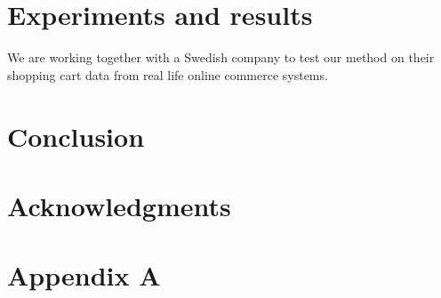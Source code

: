 \documentclass{acm_proc_article-sp}
\begin{document}

\section{Experiments and results}

We are working together with a Swedish company to test our method on their shopping cart data from real life online commerce systems. 

\section{Conclusion}
\section{Acknowledgments}




\appendix

\section{Appendix A}

\balancecolumns
\end{document}
